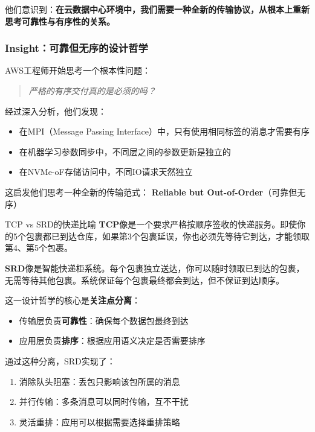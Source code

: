 他们意识到：\textbf{在云数据中心环境中，我们需要一种全新的传输协议，从根本上重新思考可靠性与有序性的关系。}

\subsubsection{Insight：可靠但无序的设计哲学}

AWS工程师开始思考一个根本性问题：

\begin{quote}
\textit{严格的有序交付真的是必须的吗？}
\end{quote}

经过深入分析，他们发现：
\begin{itemize}
    \item 在MPI（Message Passing Interface）中，只有使用相同标签的消息才需要有序
    \item 在机器学习参数同步中，不同层之间的参数更新是独立的
    \item 在NVMe-oF存储访问中，不同IO请求天然独立
\end{itemize}

这启发他们思考一种全新的传输范式：
\textbf{Reliable but Out-of-Order}（可靠但无序）

\begin{analogy}{TCP vs SRD的快递比喻}
\textbf{TCP}像是一个要求严格按顺序签收的快递服务。即使你的5个包裹都已到达仓库，如果第3个包裹延误，你也必须先等待它到达，才能领取第4、第5个包裹。

\textbf{SRD}像是智能快递柜系统。每个包裹独立送达，你可以随时领取已到达的包裹，无需等待其他包裹。系统保证每个包裹最终都会到达，但不保证到达顺序。
\end{analogy}

这一设计哲学的核心是\textbf{关注点分离}：
\begin{itemize}
    \item 传输层负责\textbf{可靠性}：确保每个数据包最终到达
    \item 应用层负责\textbf{排序}：根据应用语义决定是否需要排序
\end{itemize}

通过这种分离，SRD实现了：
\begin{enumerate}
    \item 消除队头阻塞：丢包只影响该包所属的消息
    \item 并行传输：多条消息可以同时传输，互不干扰
    \item 灵活重排：应用可以根据需要选择重排策略
\end{enumerate}

